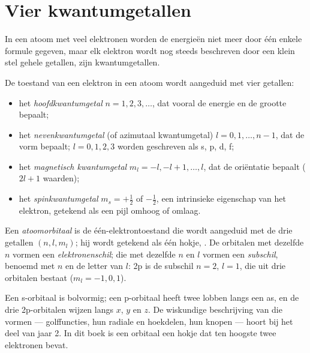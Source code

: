 \section{Vier kwantumgetallen}

In een atoom met veel elektronen worden de energieën niet meer door één
enkele formule gegeven, maar elk elektron wordt nog steeds beschreven door
een klein stel gehele getallen, zijn kwantumgetallen.

\begin{definition}[Kwantumgetallen]\label{def:b1:quantum-numbers:quantum-number}
De toestand van een elektron in een atoom wordt aangeduid met vier
getallen:
\begin{itemize}
  \item het \emph{hoofdkwantumgetal}
        $n = 1, 2, 3, \dots$, dat vooral de energie en de grootte bepaalt;
  \item het \emph{nevenkwantumgetal}
        (of azimutaal kwantumgetal) $l = 0, 1, \dots, n-1$, dat de vorm
        bepaalt; $l = 0, 1, 2, 3$ worden geschreven als s, p, d, f;
  \item het \emph{magnetisch kwantumgetal}
        $m_l = -l, -l+1, \dots, l$, dat de oriëntatie bepaalt ($2l + 1$
        waarden);
  \item het \emph{spinkwantumgetal}
        $m_s = +\tfrac12$ of $-\tfrac12$, een intrinsieke eigenschap van
        het elektron, getekend als een pijl omhoog of omlaag.
\end{itemize}
\end{definition}

\begin{definition}\label{def:b1:quantum-numbers:orbital}
Een \emph{atoomorbitaal} is de
één-elektrontoestand die wordt aangeduid met de drie getallen
$(n, l, m_l)$; hij wordt getekend als één hokje, \omorbs{}. De orbitalen
met dezelfde $n$ vormen een
\emph{elektronenschil}; die met dezelfde $n$ en
$l$ vormen een \emph{subschil}, benoemd met $n$ en de
letter van $l$: 2p is de subschil $n = 2$, $l = 1$, die uit drie
orbitalen bestaat ($m_l = -1, 0, 1$).
\end{definition}

\begin{remark}[Vormen]\label{rem:b1:quantum-numbers:shapes}
Een s-orbitaal is bolvormig; een p-orbitaal heeft twee lobben langs een
as, en de drie 2p-orbitalen wijzen langs $x$, $y$ en $z$. De wiskundige
beschrijving van die vormen --- golffuncties, hun radiale en hoekdelen,
hun knopen --- hoort bij het deel van jaar 2. In dit boek is een orbitaal
een hokje dat ten hoogste twee elektronen bevat.
\end{remark}

